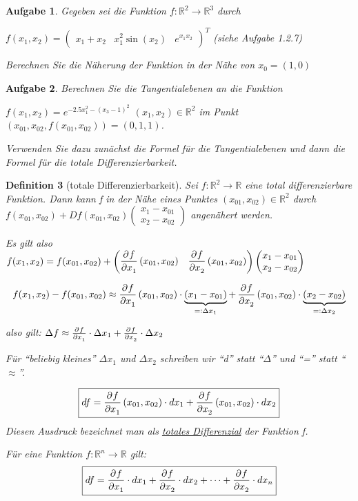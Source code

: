 \documentclass[fontset=ubuntu,12pt,a4paper]{scrreprt}
\newtheorem{defi}{Definition}[section]
\newtheorem{aufg}[defi]{Aufgabe}
\begin{document}
\begin{aufg}
Gegeben sei die Funktion \(f:\mathbb{R}^2\to\mathbb{R}^3\) durch 

\(f(x_1,x_2)=\begin{pmatrix}x_1+x_2 & x_1^2\sin(x_2) & e^{x_1x_2}\end{pmatrix}^T\) (siehe Aufgabe 1.2.7)

    Berechnen Sie die Näherung der Funktion in der Nähe von \(x_0=(1,0)\)
\end{aufg}

\begin{aufg}
    Berechnen Sie die Tangentialebenen an die Funktion
    
    \(f(x_1,x_2)=e^{-2.5x_1^2-{(x_3-1)}^2}\) \((x_1,x_2)\in\mathbb{R}^2\) im Punkt \((x_{01},x_{02},f(x_{01},x_{02}))=(0,1,1)\).

    Verwenden Sie dazu zunächst die Formel für die Tangentialebenen und dann die Formel für die totale Differenzierbarkeit.
\end{aufg}

\begin{defi}[totale Differenzierbarkeit]
Sei \(f:\mathbb{R}^2\to\mathbb{R}\) eine total differenzierbare Funktion. Dann kann f in der Nähe eines Punktes \((x_{01},x_{02})\in\mathbb{R}^2\) durch \(f(x_{01},x_{02})+Df(x_{01},x_{02})\begin{pmatrix}x_1-x_{01} \\ x_2-x_{02}\end{pmatrix}\) angenähert werden.

    Es gilt also \(f(x_1,x_2)=f(x_{01},x_{02})+\begin{pmatrix}
        \dpd{f}{x_1}(x_{01},x_{02}) & \dpd{f}{x_2}(x_{01},x_{02})\end{pmatrix}\begin{pmatrix}
            x_1-x_{01} \\ x_2-x_{02}
        \end{pmatrix}\)

\[f(x_1,x_2)-f(x_{01},x_{02})\approx\dpd{f}{x_1}(x_{01},x_{02})\cdot\underbrace{(x_1-x_{01})}_{=:\Delta x_1} + \dpd{f}{x_2}(x_{01},x_{02})\cdot\underbrace{(x_2-x_{02})}_{=:\Delta x_2}\]

also gilt: \(\Delta f\approx \pd{f}{x_1}\cdot\Delta x_1 + \pd{f}{x_2}\cdot\Delta x_2\)

Für \enquote{beliebig kleines} \(\Delta x_1\) und \(\Delta x_2\) schreiben wir \enquote{d} statt \enquote{\(\Delta\)} und \enquote{=} statt \enquote{\(\approx\)}.

\[\boxed{df = \dpd{f}{x_1}(x_{01},x_{02})\cdot dx_1 + \dpd{f}{x_2}(x_{01},x_{02})\cdot dx_2} \]
Diesen Ausdruck bezeichnet man als \underline{totales Differenzial} der Funktion f.

Für eine Funktion \(f:\mathbb{R}^n\to\mathbb{R}\) gilt:
\[\boxed{df = \dpd{f}{x_1}\cdot dx_1 + \dpd{f}{x_2}\cdot dx_2 + \cdots + \dpd{f}{x_2}\cdot dx_n}\]
\end{defi}
\end{document}
